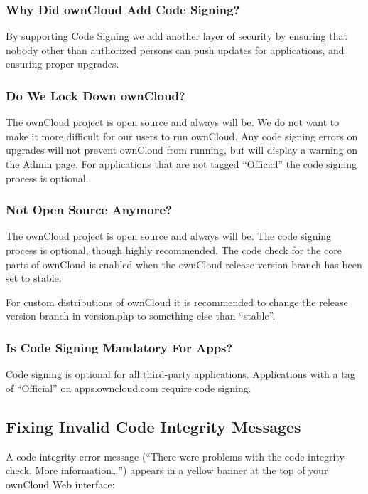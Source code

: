 \documentclass[letterpaper,10pt,english]{sphinxmanual}
\begin{document}
\subsubsection{Why Did ownCloud Add Code Signing?}
\label{issues/code_signing:why-did-owncloud-add-code-signing}
By supporting Code Signing we add another layer of security by ensuring that
nobody other than authorized persons can push updates for applications, and
ensuring proper upgrades.


\subsubsection{Do We Lock Down ownCloud?}
\label{issues/code_signing:do-we-lock-down-owncloud}
The ownCloud project is open source and always will be. We do not want to
make it more difficult for our users to run ownCloud. Any code signing errors on
upgrades will not prevent ownCloud from running, but will display a warning on
the Admin page. For applications that are not tagged ``Official'' the code signing
process is optional.


\subsubsection{Not Open Source Anymore?}
\label{issues/code_signing:not-open-source-anymore}
The ownCloud project is open source and always will be. The code signing
process is optional, though highly recommended. The code check for the
core parts of ownCloud is enabled when the ownCloud release version branch has
been set to stable.

For custom distributions of ownCloud it is recommended to change the release
version branch in version.php to something else than ``stable''.


\subsubsection{Is Code Signing Mandatory For Apps?}
\label{issues/code_signing:is-code-signing-mandatory-for-apps}
Code signing is optional for all third-party applications. Applications
with a tag of ``Official'' on apps.owncloud.com require code signing.


\subsection{Fixing Invalid Code Integrity Messages}
\label{issues/code_signing:fixing-invalid-code-integrity-messages}\label{issues/code_signing:code-signing-fix-warning-label}
A code integrity error message (``There were problems with the code integrity
check. More information…'') appears in a yellow banner at the top of your
ownCloud Web interface:
\end{document}
